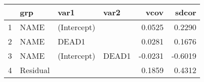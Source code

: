 \begin{table}[ht]
\centering
\begin{tabular}{rlllrr}
  \hline
 & grp & var1 & var2 & vcov & sdcor \\ 
  \hline
1 & NAME & (Intercept) &  & 0.0525 & 0.2290 \\ 
  2 & NAME & DEAD1 &  & 0.0281 & 0.1676 \\ 
  3 & NAME & (Intercept) & DEAD1 & -0.0231 & -0.6019 \\ 
  4 & Residual &  &  & 0.1859 & 0.4312 \\ 
   \hline
\end{tabular}
\end{table}
